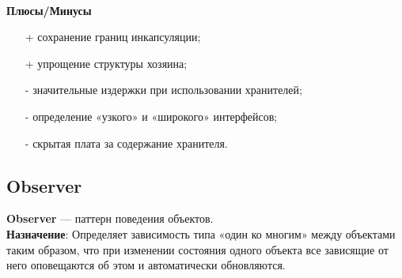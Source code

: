 \documentclass[a3paper,11pt]{report}
\begin{document}
\textbf{\\Плюсы/Минусы}
\begin{itemize}
\item [+] сохранение границ инкапсуляции;
\item [+] упрощение структуры хозяина;
\item [-] значительные издержки при использовании хранителей;
\item [-] определение «узкого» и «широкого» интерфейсов;
\item [-] скрытая плата за содержание хранителя.
\end{itemize}


\newpage
\subsection{Observer}

\large\textbf{Observer} --- паттерн поведения объектов.
\\
\large\textbf{Назначение}: Определяет зависимость типа «один ко многим» между объектами таким образом, что при изменении состояния одного объекта все зависящие от него оповещаются об этом и автоматически обновляются.
\\
\end{document}
